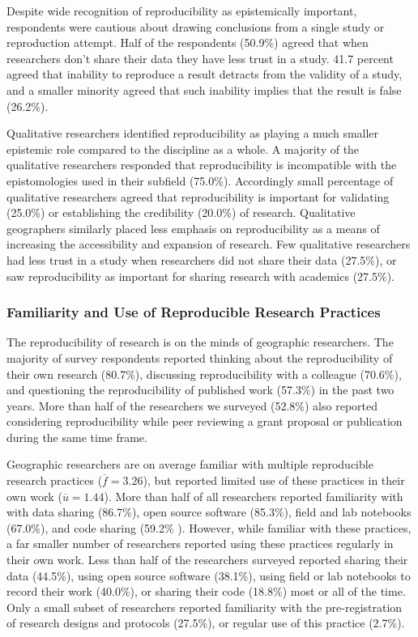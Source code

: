 \documentclass[]{interact}
\theoremstyle{plain}%
\theoremstyle{definition}
\theoremstyle{remark}
\begin{document}
Despite wide recognition of reproducibility as epistemically important, respondents were cautious about drawing conclusions from a single study or reproduction attempt. 
Half of the respondents (50.9\%) agreed that when researchers don't share their data they have less trust in a study.
41.7 percent agreed that inability to reproduce a result detracts from the validity of a study, and a smaller minority agreed that such inability implies that the result is false (26.2\%).

Qualitative researchers identified reproducibility as playing a much smaller epistemic role compared to the discipline as a whole. 
A majority of the qualitative researchers responded that reproducibility is incompatible with the epistomologies used in their subfield (75.0\%).
Accordingly small percentage of qualitative researchers agreed that reproducibility is important for validating (25.0\%) or establishing the credibility (20.0\%) of research.
Qualitative geographers similarly placed less emphasis on reproducibility as a means of increasing the accessibility and expansion of research.
Few qualitative researchers had less trust in a study when researchers did not share their data (27.5\%), or saw reproducibility as important for sharing research with academics (27.5\%).



\subsubsection*{Familiarity and Use of Reproducible Research Practices}
The reproducibility of research is on the minds of geographic researchers. 
The majority of survey respondents reported thinking about the reproducibility of their own research (80.7\%), discussing reproducibility with a colleague (70.6\%), and questioning the reproducibility of published work (57.3\%) in the past two years. 
More than half of the researchers we surveyed (52.8\%) also reported considering reproducibility while peer reviewing a grant proposal or publication during the same time frame. 

Geographic researchers are on average familiar with multiple reproducible research practices ($\overline{f}=3.26$), but reported limited use of these practices in their own work ($\overline{u}=1.44$).
More than half of all researchers reported familiarity with with data sharing (86.7\%), open source software (85.3\%), field and lab notebooks (67.0\%), and code sharing (59.2\% ).
However, while familiar with these practices, a far smaller number of researchers reported using these practices regularly in their own work. 
Less than half of the researchers surveyed reported sharing their data (44.5\%), using open source software (38.1\%), using field or lab notebooks to record their work (40.0\%), or sharing their code (18.8\%) most or all of the time. 
Only a small subset of researchers reported familiarity with the pre-registration of research designs and protocols (27.5\%), or regular use of this practice (2.7\%).
\end{document}
